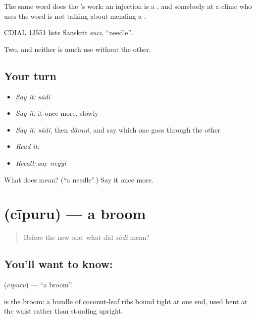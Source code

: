 The same word does the 's work: an injection is a , and somebody at a clinic who uses the word is not talking about mending a .

CDIAL 13551 lists Sanskrit \emph{sūcī}, \textquotedblleft{}needle\textquotedblright{}.

\begin{grammarlens}[title={What you've built}]
Two, and neither is much use without the other.
\end{grammarlens}

\subsection*{Your turn}
\begin{itemize}
\raggedright
  \item \emph{Say it:} \emph{sūdi}
  \item \emph{Say it:} it once more, slowly
  \item \emph{Say it:} \emph{sūdi}, then \emph{dāraṁ}, and say which one goes through the other
  \item \emph{Read it:} \textbf{}
  \item \emph{Recall:} say \emph{neyyi}
\end{itemize}

\begin{tcolorbox}[breakable,colback=teal!4,colframe=teal!35!black,title={Before you move on}]
What does  mean? (\textquotedblleft{}a needle\textquotedblright{}.) Say it once more.
\end{tcolorbox}
\section[\texorpdfstring{\te{చీపురు} (cīpuru)}{చీపురు (cīpuru)}]{ (cīpuru) — a broom}

\label{lesson:TE-C62-broom}



\begin{quote}
Before the new one: what did \emph{sūdi} mean?
\end{quote}

\subsection*{You'll want to know: }
\textbf{} (\emph{cīpuru}) — \textquotedblleft{}a broom\textquotedblright{}.

 is the broom: a bundle of coconut-leaf ribs bound tight at one end, used bent at the waist rather than standing upright.

